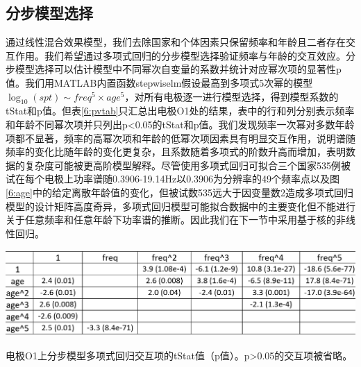 \subsection{分步模型选择}
通过线性混合效果模型，我们去除国家和个体因素只保留频率和年龄且二者存在交互作用。我们希望通过多项式回归的分步模型选择验证频率与年龄的交互效应。分步模型选择可以估计模型中不同幂次自变量的系数并统计对应幂次项的显著性p值。我们用MATLAB内置函数stepwiselm假设最高到多项式5次幂的模型$\log_{10}(spt)\sim{freq^5\times{age^5}}$，对所有电极逐一进行模型选择，得到模型系数的tStat和p值。但表\ref{6:pvtab}只汇总出电极O1处的结果，表中的行和列分别表示频率和年龄不同幂次项并只列出p<0.05的tStat和p值。我们发现频率一次幂对多数年龄项都不显著，频率的高幂次项和年龄的低幂次项因素具有明显交互作用，说明谱随频率的变化比随年龄的变化更复杂，且系数随着多项式的阶数升高而增加，表明数据的复杂度可能被更高阶模型解释。尽管使用多项式回归可拟合三个国家535例被试在每个电极上功率谱随0.3906-19.14Hz以0.3906为分辨率的49个频率点以及图\ref{6:age}中的给定离散年龄值的变化，但被试数535远大于因变量数2造成多项式回归模型的设计矩阵高度奇异，多项式回归模型可能拟合数据中的主要变化但不能进行关于任意频率和任意年龄下功率谱的推断。因此我们在下一节中采用基于核的非线性回归。
\begin{table}[!h]
\includegraphics[width=\linewidth]{pic/Norm/pvtab.png}
\caption{电极O1上分步模型多项式回归交互项的tStat值（p值）。p>0.05的交互项被省略。}
\label{6:pvtab}
\end{table}

